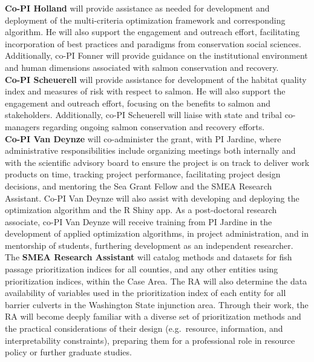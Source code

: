 \documentclass[12pt]{elsarticle}
\begin{document}
\textbf{Co-PI Holland} will provide assistance as needed for development and deployment of the multi-criteria optimization framework and corresponding algorithm. He will also support the engagement and outreach effort, facilitating incorporation of best practices and paradigms from conservation social sciences. Additionally, co-PI Fonner will provide guidance on the institutional environment and human dimensions associated with salmon conservation and recovery.\\

\textbf{Co-PI Scheuerell} will provide assistance for development of the habitat quality index and measures of risk with respect to salmon. He will also support the engagement and outreach effort, focusing on the benefits to salmon and stakeholders. Additionally, co-PI Scheuerell will liaise with state and tribal co-managers regarding ongoing salmon conservation and recovery efforts.\\

\textbf{Co-PI Van Deynze} will co-administer the grant, with PI Jardine, where administrative responsibilities include organizing meetings both internally and with the scientific advisory board to ensure the project is on track to deliver work products on time, tracking project performance, facilitating project design decisions, and mentoring the Sea Grant Fellow and the SMEA Research Assistant. Co-PI Van Deynze will also assist with developing and deploying the optimization algorithm and the R Shiny app. As a post-doctoral research associate, co-PI Van Deynze will receive training from PI Jardine in the development of applied optimization algorithms, in project administration, and in mentorship of students, furthering development as an independent researcher. \\

The \textbf{SMEA Research Assistant} will catalog methods and datasets for fish passage prioritization indices for all counties, and any other entities using prioritization indices, within the Case Area. The RA will also determine the data availability of variables used in the prioritization index of each entity for all barrier culverts in the Washington State injunction area. Through their work, the RA will become deeply familiar with a diverse set of prioritization methods and the practical considerations of their design (e.g.\ resource, information, and interpretability constraints), preparing them for a professional role in resource policy or further graduate studies. \\
\end{document}
